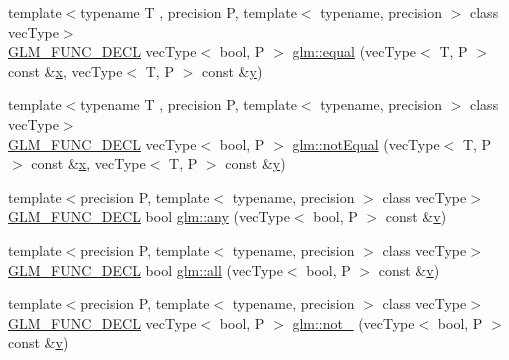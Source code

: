 \begin{DoxyCompactItemize}
\item 
{\footnotesize template$<$typename T , precision P, template$<$ typename, precision $>$ class vec\+Type$>$ }\\\mbox{\hyperlink{setup_8hpp_ab2d052de21a70539923e9bcbf6e83a51}{G\+L\+M\+\_\+\+F\+U\+N\+C\+\_\+\+D\+E\+CL}} vec\+Type$<$ bool, P $>$ \mbox{\hyperlink{group__core__func__vector__relational_ga39c80d8baf49b0ce69f2bb22d45b3801}{glm\+::equal}} (vec\+Type$<$ T, P $>$ const \&\mbox{\hyperlink{glad_8h_a92d0386e5c19fb81ea88c9f99644ab1d}{x}}, vec\+Type$<$ T, P $>$ const \&\mbox{\hyperlink{glad_8h_a66ddd433d2cacfe27f5906b7e86faeed}{y}})
\item 
{\footnotesize template$<$typename T , precision P, template$<$ typename, precision $>$ class vec\+Type$>$ }\\\mbox{\hyperlink{setup_8hpp_ab2d052de21a70539923e9bcbf6e83a51}{G\+L\+M\+\_\+\+F\+U\+N\+C\+\_\+\+D\+E\+CL}} vec\+Type$<$ bool, P $>$ \mbox{\hyperlink{group__core__func__vector__relational_ga5aca2b745e5eb0096716bbc394846309}{glm\+::not\+Equal}} (vec\+Type$<$ T, P $>$ const \&\mbox{\hyperlink{glad_8h_a92d0386e5c19fb81ea88c9f99644ab1d}{x}}, vec\+Type$<$ T, P $>$ const \&\mbox{\hyperlink{glad_8h_a66ddd433d2cacfe27f5906b7e86faeed}{y}})
\item 
{\footnotesize template$<$precision P, template$<$ typename, precision $>$ class vec\+Type$>$ }\\\mbox{\hyperlink{setup_8hpp_ab2d052de21a70539923e9bcbf6e83a51}{G\+L\+M\+\_\+\+F\+U\+N\+C\+\_\+\+D\+E\+CL}} bool \mbox{\hyperlink{group__core__func__vector__relational_ga632a2644532d9332011c8860400d30b2}{glm\+::any}} (vec\+Type$<$ bool, P $>$ const \&\mbox{\hyperlink{glad_8h_a14cfbe2fc2234f5504618905b69d1e06}{v}})
\item 
{\footnotesize template$<$precision P, template$<$ typename, precision $>$ class vec\+Type$>$ }\\\mbox{\hyperlink{setup_8hpp_ab2d052de21a70539923e9bcbf6e83a51}{G\+L\+M\+\_\+\+F\+U\+N\+C\+\_\+\+D\+E\+CL}} bool \mbox{\hyperlink{group__core__func__vector__relational_ga14bbc94f2ae2774a1d64d91f8767773e}{glm\+::all}} (vec\+Type$<$ bool, P $>$ const \&\mbox{\hyperlink{glad_8h_a14cfbe2fc2234f5504618905b69d1e06}{v}})
\item 
{\footnotesize template$<$precision P, template$<$ typename, precision $>$ class vec\+Type$>$ }\\\mbox{\hyperlink{setup_8hpp_ab2d052de21a70539923e9bcbf6e83a51}{G\+L\+M\+\_\+\+F\+U\+N\+C\+\_\+\+D\+E\+CL}} vec\+Type$<$ bool, P $>$ \mbox{\hyperlink{group__core__func__vector__relational_ga4329ecbc2ef012c9ec704bd09da1f177}{glm\+::not\+\_\+}} (vec\+Type$<$ bool, P $>$ const \&\mbox{\hyperlink{glad_8h_a14cfbe2fc2234f5504618905b69d1e06}{v}})
\end{DoxyCompactItemize}


